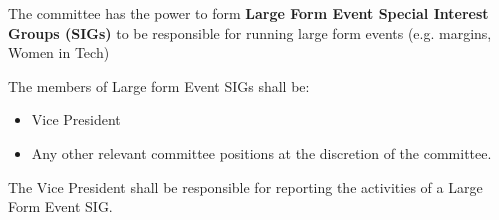 \begin{clause}
    The committee has the power to form \textbf{Large Form Event Special Interest Groups (SIGs)} to be responsible for running large form events (e.g. margins, Women in Tech)
\end{clause}

\begin{subclause}
    The members of Large form Event SIGs shall be:
    \begin{itemize}[label=--,topsep=0em,itemsep=0em]
        \item Vice President
        \item Any other relevant committee positions at the discretion of the committee.
    \end{itemize}
\end{subclause}

\begin{subclause}
    The Vice President shall be responsible for reporting the activities of a Large Form Event SIG.
\end{subclause}
